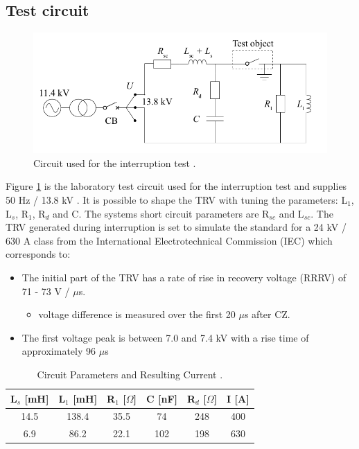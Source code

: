 \documentclass[10pt,a4paper,twoside]{article}
\begin{document}
\newpage
\subsection{Test circuit}

\begin{figure} [H]
\centering
\includegraphics[scale=0.3]{Bilder/Method/circuit.png}
\caption{Circuit used for the interruption test \cite{bib:AFIMVLBA}.} \label{fig:testCurcuit}
\end{figure}

Figure \ref{fig:testCurcuit} is the laboratory test circuit used for the interruption test and supplies 50 Hz / 13.8 kV . It is possible to shape the TRV with tuning the parameters: L$_1$, L$_s$, R$_1$, R$_d$ and C. The systems short circuit parameters are R$_{sc}$ and L$_{sc}$. The TRV generated during interruption is set to simulate the standard for a 24 kV / 630 A class from the International Electrotechnical Commission (IEC) which corresponds to:

\begin{itemize}
\item The initial part of the TRV has a rate of rise in recovery voltage (RRRV) of 71 - 73 V / $\mu$s.
	\begin{itemize}
		\item voltage difference is measured over the first 20 $\mu$s after CZ.
	\end{itemize}
\item The first voltage peak is between 7.0 and 7.4 kV with a rise time of approximately 96 $\mu$s
\end{itemize}

\begin{table}[H]
\center
\caption{Circuit Parameters and Resulting Current \cite{bib:AFIMVLBA}. }
\begin{tabular}{|c|c|c|c|c|c|}
\hline 
L$_s$ [mH] & L$_1$ [mH] & R$_1$ [$\Omega$] & C [nF] & R$_{d}$ [$\Omega$] & I [A] \\ 
\hline 
14.5 & 138.4 & 35.5 & 74 & 248 & 400 \\ 
\hline 
6.9 & 86.2 & 22.1 & 102 & 198 & 630 \\ 
\hline 
\end{tabular} 
\label{tab:testParameters}
\end{table}
\end{document}
